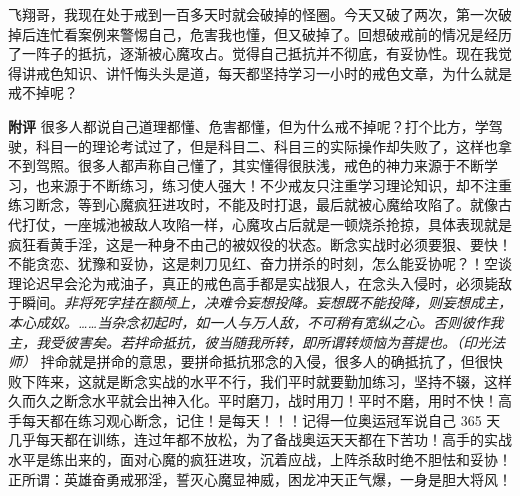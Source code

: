 \begin{case}
    飞翔哥，我现在处于戒到一百多天时就会破掉的怪圈。今天又破了两次，第一次破掉后连忙看案例来警惕自己，危害我也懂，但又破掉了。回想破戒前的情况是经历了一阵子的抵抗，逐渐被心魔攻占。觉得自己抵抗并不彻底，有妥协性。现在我觉得讲戒色知识、讲忏悔头头是道，每天都坚持学习一小时的戒色文章，为什么就是戒不掉呢？

    \textbf{附评} 很多人都说自己道理都懂、危害都懂，但为什么戒不掉呢？打个比方，学驾驶，科目一的理论考试过了，但是科目二、科目三的实际操作却失败了，这样也拿不到驾照。很多人都声称自己懂了，其实懂得很肤浅，戒色的神力来源于不断学习，也来源于不断练习，练习使人强大！不少戒友只注重学习理论知识，却不注重练习断念，等到心魔疯狂进攻时，不能及时打退，最后就被心魔给攻陷了。就像古代打仗，一座城池被敌人攻陷一样，心魔攻占后就是一顿烧杀抢掠，具体表现就是疯狂看黄手淫，这是一种身不由己的被奴役的状态。断念实战时必须要狠、要快！不能贪恋、犹豫和妥协，这是刺刀见红、奋力拼杀的时刻，怎么能妥协呢？！空谈理论迟早会沦为戒油子，真正的戒色高手都是实战狠人，在念头入侵时，必须毙敌于瞬间。\textit{非将死字挂在额颅上，决难令妄想投降。妄想既不能投降，则妄想成主，本心成奴。……当杂念初起时，如一人与万人敌，不可稍有宽纵之心。否则彼作我主，我受彼害矣。若拌命抵抗，彼当随我所转，即所谓转烦恼为菩提也。（印光法师）} 拌命就是拼命的意思，要拼命抵抗邪念的入侵，很多人的确抵抗了，但很快败下阵来，这就是断念实战的水平不行，我们平时就要勤加练习，坚持不辍，这样久而久之断念水平就会出神入化。平时磨刀，战时用刀！平时不磨，用时不快！高手每天都在练习观心断念，记住！是每天！！！记得一位奥运冠军说自己 365 天几乎每天都在训练，连过年都不放松，为了备战奥运天天都在下苦功！高手的实战水平是练出来的，面对心魔的疯狂进攻，沉着应战，上阵杀敌时绝不胆怯和妥协！正所谓：英雄奋勇戒邪淫，誓灭心魔显神威，困龙冲天正气爆，一身是胆大将风！
\end{case}

